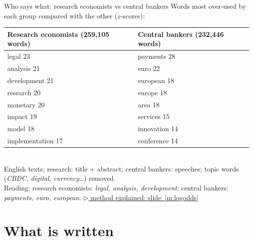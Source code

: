 \documentclass[aspectratio=169,10pt]{beamer}
\newcommand{\method}[1]{\hfill\hyperref[#1]{\tiny\textcolor{c4}{$\triangleright$ method explained: slide~\ref*{#1}}}}
\begin{document}
\begin{frame}{Who says what: research economists vs central bankers}
\footnotesize
Words most over-used by each group compared with the other ($z$-scores):\\[4pt]
\begin{tabular}{@{}p{}p{}@{}}\toprule
\textbf{Research economists} \scriptsize(259,105 words) & \textbf{Central bankers} \scriptsize(232,446 words)\\\midrule
legal \hfill 23 & payments \hfill 28 \\
analysis \hfill 21 & euro \hfill 22 \\
development \hfill 21 & european \hfill 18 \\
research \hfill 20 & europe \hfill 18 \\
monetary \hfill 20 & area \hfill 18 \\
impact \hfill 19 & services \hfill 15 \\
model \hfill 18 & innovation \hfill 14 \\
implementation \hfill 17 & conference \hfill 14 \\
\bottomrule\end{tabular}\\[4pt]
\scriptsize English texts; research: title + abstract; central bankers: speeches; topic words (\emph{CBDC, digital, currency\dots}) removed.\\[3pt]
\small \alert{Reading}: research economists: \emph{legal, analysis, development}; central bankers: \emph{payments, euro, european}.
\method{m:logodds}
\end{frame}

\section{What is written}
\end{document}
